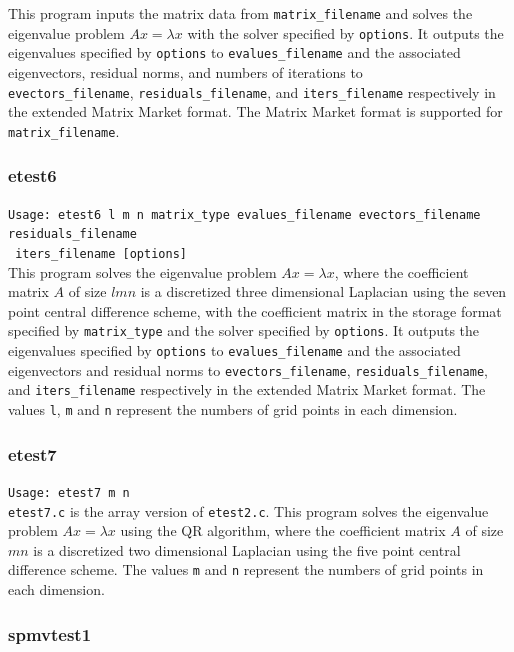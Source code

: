 \documentclass[a4paper]{article}
\begin{document}
This program inputs the matrix data from {\tt matrix\_filename} and
solves the eigenvalue problem $Ax=\lambda x$ with
the solver specified by {\tt options}. 
It outputs the eigenvalues specified by {\tt options} to 
{\tt evalues\_filename} and the associated 
eigenvectors, residual norms, and numbers of iterations  
to \\ {\tt evectors\_filename}, {\tt residuals\_filename}, 
and {\tt iters\_filename} respectively in the extended 
Matrix Market format. The Matrix Market format is supported for 
{\tt matrix\_filename}. 

\subsubsection{etest6}

\verb+Usage: etest6 l m n matrix_type evalues_filename evectors_filename residuals_filename +\\
\verb+ iters_filename [options] +\\

This program solves the eigenvalue problem $Ax = \lambda x$, where the 
coefficient matrix $A$ of size $lmn$ is a discretized three dimensional Laplacian using the seven
point central difference scheme, with the coefficient matrix in the storage format specified
by \verb|matrix_type| and the solver specified by {\tt options}. 
It outputs the eigenvalues specified by {\tt options} to 
{\tt evalues\_filename} and the associated 
eigenvectors and residual norms to {\tt evectors\_filename},  
{\tt residuals\_filename}, and {\tt iters\_filename} respectively 
in the extended Matrix Market format.
The values {\tt l}, {\tt m} and {\tt n} represent the numbers of grid
points in each dimension.

\subsubsection{etest7}

\verb+Usage: etest7 m n+\\

{\tt etest7.c} is the array version of {\tt etest2.c}.
This program solves the eigenvalue problem $Ax = \lambda x$ using
the QR algorithm, where the 
coefficient matrix $A$ of size $mn$ is a discretized two dimensional Laplacian using the five
point central difference scheme. 
The values {\tt m} and {\tt n} represent the numbers of grid points
in each dimension. 

\subsubsection{spmvtest1}
\end{document}
